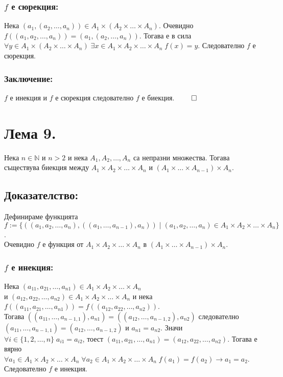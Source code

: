 \documentclass[a4paper, 12pt, oneside]{article}
\newcommand{\N}{\mathbb{N}}
\begin{document}
\subsubsection*{\(f\) е сюрекция:}
Нека \((a_1, (a_2, \dots, a_n)) \in A_1 \times (A_2 \times \dots \times A_n)\).
Очевидно \(f((a_1, a_2, \dots, a_n)) = (a_1, (a_2, \dots, a_n))\). Тогава е в сила \\
\(\forall y \in A_1 \times (A_2 \times \dots \times A_n) \; \exists x \in A_1 \times A_2 \times \dots \times A_n \; f(x) = y\).
Следователно \(f\) е сюрекция.
\subsubsection*{Заключение:}
\(f\) е инекция и \(f\) е сюрекция следователно \(f\) е биекция. \(\qed\)
\section*{Лема 9.}
Нека \(n \in \N\) и \(n > 2\) и нека 
\(A_1, A_2, \dots, A_n\) са непразни множества.
Тогава съществува биекция между \(A_1 \times A_2 \times \dots \times A_n\)
и \((A_1 \times \dots \times A_{n - 1}) \times A_n\).
\subsection*{Доказателство:}
Дефинираме функцията \\
\(f := \{((a_1, a_2, \dots, a_n), ((a_1, \dots, a_{n - 1}), a_n)) \; | \; (a_1, a_2, \dots, a_n) \in A_1 \times A_2 \times \dots \times A_n\}\). \\
Очевидно \(f\) е функция от \(A_1 \times A_2 \times \dots \times A_n\) в \((A_1 \times \dots \times A_{n - 1}) \times A_n\).
\subsubsection*{\(f\) е инекция:}
Нека \((a_{11}, a_{21}, \dots, a_{n1}) \in A_1 \times A_2 \times \dots \times A_n\) \\
и \((a_{12}, a_{22}, \dots, a_{n2}) \in A_1 \times A_2 \times \dots \times A_n\)
и нека \(f((a_{11}, a_{21}, \dots, a_{n1})) = f((a_{12}, a_{22}, \dots, a_{n2}))\). \\
Тогава \(((a_{11}, \dots, a_{n - 1,1}), a_{n1}) = ((a_{12}, \dots, a_{n - 1,2}), a_{n2})\)
следователно \((a_{11}, \dots, a_{n - 1,1}) = (a_{12}, \dots, a_{n - 1,2})\) и \(a_{n1} = a_{n2}\).
Значи \(\forall i \in \{1, 2, \dots, n\} \; a_{i1} = a_{i2}\),
тоест \((a_{11}, a_{21}, \dots, a_{n1}) = (a_{12}, a_{22}, \dots, a_{n2})\).
Тогава е вярно \\
\(\forall a_1 \in A_1 \times A_2 \times \dots \times A_n \; \forall a_2 \in A_1 \times A_2 \times \dots \times A_n \; f(a_1) = f(a_2) \longrightarrow a_1 = a_2\).
Следователно \(f\) е инекция.
\end{document}
